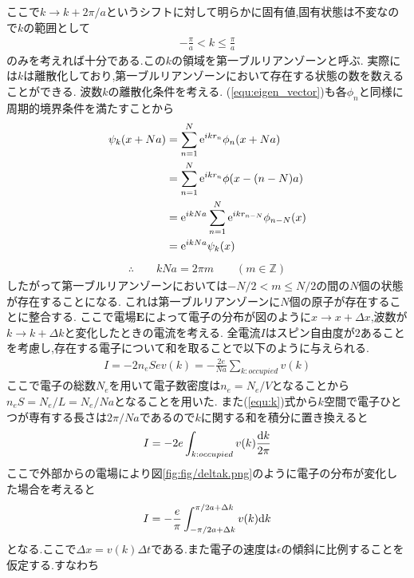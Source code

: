 ここで$k\rightarrow k+2\pi/a$というシフトに対して明らかに固有値,固有状態は不変なので$k$の範囲として
\begin{align}
  -\frac{\pi}{a}<k\leq\frac{\pi}{a}
\end{align}
のみを考えれば十分である.この$k$の領域を第一ブルリアンゾーンと呼ぶ.
実際には$k$は離散化しており,第一ブルリアンゾーンにおいて存在する状態の数を数えることができる.
波数$k$の離散化条件を考える.
(\ref{equ:eigen_vector})も各$\phi_n$と同様に周期的境界条件を満たすことから
\begin{align}
  \begin{split}
    \psi_k(x+Na)&=\sum_{n=1}^N{\rm e}^{ikr_n}\phi_n(x+Na)\\
    &=\sum_{n=1}^N{\rm e}^{ikr_n}\phi(x-(n-N)a)\\
    &={\rm e}^{ikNa}\sum_{n=1}^N{\rm e}^{ikr_{n-N}}\phi_{n-N}(x)\\
    &={\rm e}^{ikNa}\psi_k(x)\\
  \end{split}
\end{align}
\begin{align}
  \label{equ:k}
  \therefore\qquad kNa=2\pi m\qquad(m\in\mathbb{Z})
\end{align}
したがって第一ブルリアンゾーンにおいては$-N/2<m\leq N/2$の間の$N$個の状態が存在することになる.
これは第一ブルリアンゾーンに$N$個の原子が存在することに整合する.
ここで電場$\bm E$によって電子の分布が図のように$x\rightarrow x+\Delta x$,波数が$k\rightarrow k+\Delta k$と変化したときの電流を考える.
全電流$I$はスピン自由度が$2$あることを考慮し,存在する電子について和を取ることで以下のように与えられる.
\begin{align}
  I=-2n_eSev(k)=-\frac{2e}{Na}\sum_{k:occupied}v(k)
\end{align}
ここで電子の総数$N_e$を用いて電子数密度は$n_e=N_e/V$となることから$n_eS=N_e/L=N_e/Na$となることを用いた.
また(\ref{equ:k})式から$k$空間で電子ひとつが専有する長さは$2\pi/Na$であるので$k$に関する和を積分に置き換えると
\begin{align}
  I=-2e\int_{k:occupied}v(k)\frac{{\rm d}k}{2\pi}
\end{align}
ここで外部からの電場により図\ref{fig:fig/deltak.png}のように電子の分布が変化した場合を考えると
\begin{align}
  I=-\frac{e}{\pi}\int_{-\pi/2a+\Delta k}^{\pi/2a+\Delta k}v(k){\rm d}k
\end{align}
となる.ここで$\Delta x=v(k)\Delta t$である.また電子の速度は$\epsilon$の傾斜に比例することを仮定する.すなわち
